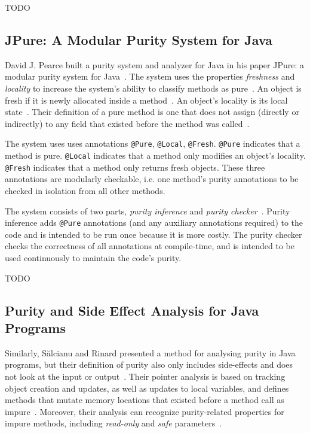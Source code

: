 \documentclass[a4paper,12pt]{article}
\begin{document}
TODO


\subsection{JPure: A Modular Purity System for Java} \label{sub:JPure: A Modular Purity System for Java}
David J. Pearce built a purity system and analyzer for Java in his paper JPure: a modular purity system for Java~\cite{pearce2011jpure}. The system uses the properties \textit{freshness} and \textit{locality} to increase the system's ability to classify methods as pure~\cite{pearce2011jpure}. An object is fresh if it is newly allocated inside a method~\cite{pearce2011jpure}. An object's locality is its local state~\cite{pearce2011jpure}. Their definition of a pure method is one that does not assign (directly or indirectly) to any field that existed before the method was called~\cite{pearce2011jpure}.

The system uses uses annotations \texttt{@Pure}, \texttt{@Local}, \texttt{@Fresh}. \texttt{@Pure} indicates that a method is pure. \texttt{@Local} indicates that a method only modifies an object's locality. \texttt{@Fresh} indicates that a method only returns fresh objects. These three annotations are modularly checkable, i.e. one method's purity annotations to be checked in isolation from all other methods.

The system consists of two parts, \textit{purity inference} and \textit{purity checker}~\cite{pearce2011jpure}. Purity inference adds \texttt{@Pure} annotations (and any auxiliary annotations required) to the code and is intended to be run once because it is more costly. The purity checker checks the correctness of all annotations at compile-time, and is intended to be used continuously to maintain the code's purity.

TODO

\subsection{Purity and Side Effect Analysis for Java Programs} \label{sub:Purity and Side Effect Analysis for Java Programs}
Similarly, S\u{a}lcianu and Rinard presented a method for analysing purity in Java programs, but their definition of purity also only includes side-effects and does not look at the input or output~\cite{salcianu}. Their pointer analysis is based on tracking object creation and updates, as well as updates to local variables, and defines methods that mutate memory locations that existed before a method call as impure~\cite{salcianu}. Moreover, their analysis can recognize purity-related properties for impure methods, including \textit{read-only} and \textit{safe} parameters~\cite{salcianu}.
\end{document}
